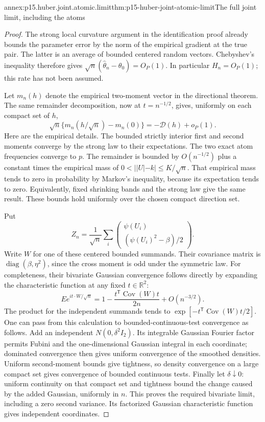 \begin{annexitem}{annex:p15.huber.joint.atomic.limit}{thm:p15-huber-joint-atomic-limit}{The full joint limit, including the atoms}
\begin{proof}
The strong local curvature argument in the identification proof
already bounds the parameter error by the norm of the empirical
gradient at the true pair. The latter is an average of bounded
centered random vectors. Chebyshev's inequality therefore gives
\(\sqrt n(\widehat\theta_n-\theta_0)=O_P(1)\).
In particular \(H_n=O_P(1)\); this rate has not been assumed.

Let \(m_n(h)\) denote the empirical two-moment vector in the
directional theorem. The same remainder decomposition, now at
\(t=n^{-1/2}\), gives, uniformly on each compact set of \(h\),
\[
 \sqrt n\{m_n(h/\sqrt n)-m_n(0)\}
                         =-\mathcal D(h)+o_P(1).
\]
Here are the empirical details. The bounded strictly interior
first and second moments converge by the strong law to their
expectations. The two exact atom frequencies converge to \(p\).
The remainder is bounded by \(O(n^{-1/2})\) plus a constant
times the empirical mass of
\(0<||U|-k|\leq K/\sqrt n\).
That empirical mass tends to zero in probability by Markov's
inequality, because its expectation tends to zero. Equivalently,
fixed shrinking bands and the strong law give the same result.
These bounds hold uniformly over the chosen compact direction set.

Put
\[
 Z_n=\frac1{\sqrt n}\sum_i
       \begin{pmatrix}
       \psi(U_i)\\(\psi(U_i)^2-\beta)/2
       \end{pmatrix}.
\]
Write \(W\) for one of these centered bounded summands.
Their covariance matrix is
\(\operatorname{diag}(\beta,\eta^2)\), since the cross moment
is odd under the symmetric law.
For completeness, their bivariate Gaussian convergence follows
directly by expanding the characteristic function at any
fixed \(t\in\mathbb R^2\):
\[
 E e^{it\cdot W/\sqrt n}
       =1-\frac{t^{\mathsf T}\operatorname{Cov}(W)t}{2n}
          +O(n^{-3/2}).
\]
The product for the independent summands tends to
\(\exp[-t^{\mathsf T}\operatorname{Cov}(W)t/2]\).
One can pass from this calculation to bounded-continuous-test
convergence as follows. Add an independent \(N(0,\delta^2 I_2)\).
Its integrable Gaussian Fourier factor permits Fubini and the
one-dimensional Gaussian integral in each coordinate; dominated
convergence then gives uniform convergence of the smoothed
densities. Uniform second-moment bounds give tightness, so density
convergence on a large compact set gives convergence of bounded
continuous tests. Finally let \(\delta\downarrow0\): uniform
continuity on that compact set and tightness bound the change
caused by the added Gaussian, uniformly in \(n\).
This proves the required bivariate limit, including a zero
second variance. Its factorized Gaussian characteristic function
gives independent coordinates.


\end{proof}
\end{annexitem}
